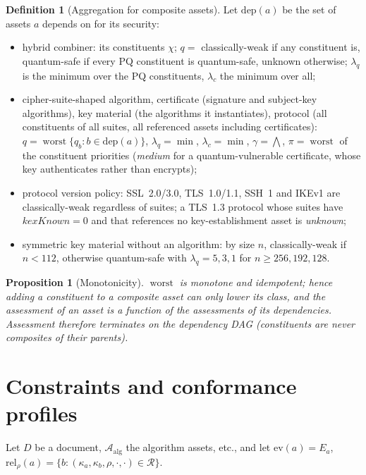 \documentclass[11pt,a4paper]{article}
\newcommand{\Assets}{\mathcal{A}}
\newcommand{\Rels}{\mathcal{R}}
\newcommand{\worst}{\operatorname{worst}}
\theoremstyle{definition}
\newtheorem{definition}{Definition}[section]
\theoremstyle{plain}
\newtheorem{proposition}[theorem]{Proposition}
\begin{document}
\begin{definition}[Aggregation for composite assets]\label{def:aggregate}
Let $\mathrm{dep}(a)$ be the set of assets $a$ depends on for its security:
\begin{itemize}[nosep]
\item hybrid combiner: its constituents $\chi$; $q = $ classically-weak if any constituent is,
      quantum-safe if every PQ constituent is quantum-safe, unknown otherwise; $\lambda_q$ is the
      minimum over the PQ constituents, $\lambda_c$ the minimum over all;
\item cipher-suite-shaped algorithm, certificate (signature and subject-key algorithms), key
      material (the algorithms it instantiates), protocol (all constituents of all suites, all
      referenced assets including certificates): $q = \worst\{q_b : b \in \mathrm{dep}(a)\}$,
      $\lambda_q = \min$, $\lambda_c = \min$, $\gamma = \bigwedge$, $\pi = \worst$ of the
      constituent priorities (\emph{medium} for a quantum-vulnerable certificate, whose key
      authenticates rather than encrypts);
\item protocol version policy: SSL~2.0/3.0, TLS~1.0/1.1, SSH~1 and IKEv1 are classically-weak
      regardless of suites; a TLS~1.3 protocol whose suites have $\textit{kexKnown} = 0$ and
      that references no key-establishment asset is \emph{unknown};
\item symmetric key material without an algorithm: by size $n$, classically-weak if $n<112$,
      otherwise quantum-safe with $\lambda_q = 5,3,1$ for $n \ge 256, 192, 128$.
\end{itemize}
\end{definition}

\begin{proposition}[Monotonicity]
$\worst$ is monotone and idempotent; hence adding a constituent to a composite asset can only
lower its class, and the assessment of an asset is a function of the assessments of its
dependencies. Assessment therefore terminates on the dependency DAG (constituents are never
composites of their parents).
\end{proposition}

\section{Constraints and conformance profiles}\label{sec:constraints}
Let $D$ be a document, $\Assets_{\mathrm{alg}}$ the algorithm assets, etc., and let
$\mathrm{ev}(a) = E_a$, $\mathrm{rel}_\rho(a) = \{b : (\kappa_a,\kappa_b,\rho,\cdot,\cdot) \in \Rels\}$.
\end{document}
